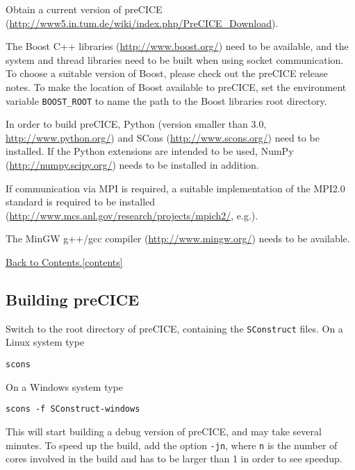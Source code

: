 \documentclass[11pt, oneside]{scrartcl}
\newcommand{\backtocontents}{\hyperref[contents]{Back to Contents.\ref*{contents}}}
\begin{document}
\begin{itemize*} 
\item Obtain a current version of preCICE (\url{http://www5.in.tum.de/wiki/index.php/PreCICE_Download}).

\item The Boost C++ libraries (\url{http://www.boost.org/}) need to be available, and the system and thread libraries need to be built when using socket communication. To choose a suitable version of Boost, please check out the preCICE release notes. To make the location of Boost available to preCICE, set the environment variable \texttt{BOOST\_ROOT} to name the path to the Boost libraries root directory.

\item In order to build preCICE, Python (version smaller than 3.0, \url{http://www.python.org/}) and SCons (\url{http://www.scons.org/}) need to be installed. If the Python extensions are intended to be used, NumPy (\url{http://numpy.scipy.org/}) needs to be installed in addition.

\item If communication via MPI is required, a suitable  implementation of the MPI2.0 standard is required to be installed
(\url{http://www.mcs.anl.gov/research/projects/mpich2/}, e.g.).

\item The MinGW g++/gcc compiler (\url{http://www.mingw.org/}) needs to be available. 
\end{itemize*}

\backtocontents

\subsection{Building preCICE}

Switch to the root directory of preCICE, containing the \texttt{SConstruct} files. On a Linux system type
\begin{verbatim}
scons
\end{verbatim}
On a Windows system type
\begin{verbatim}
scons -f SConstruct-windows
\end{verbatim}
This will start building a debug version of preCICE, and may take several minutes. To speed up the build, add the option \texttt{-jn}, where \texttt{n} is the number of cores
involved in the build and has to be larger than 1 in order to see speedup.
\end{document}
